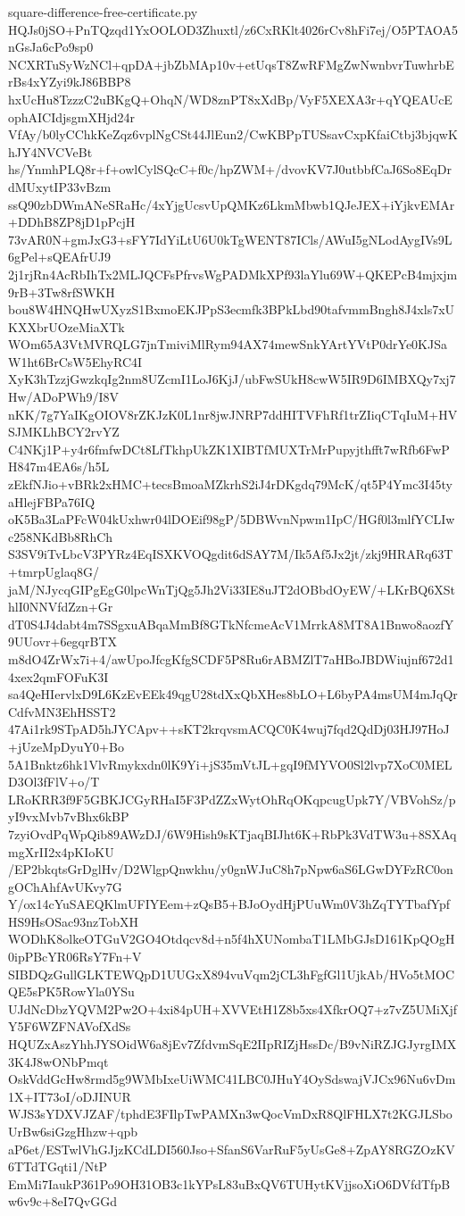 \documentclass[11pt]{article}
\theoremstyle{definition}
\theoremstyle{remark}
\begin{document}
\begin{filecontents*}[overwrite]{square-difference-free-certificate.py}
HQJs0jSO+PnTQzqd1YxOOLOD3Zhuxtl/z6CxRKlt4026rCv8hFi7ej/O5PTAOA5nGsJa6cPo9sp0
NCXRTuSyWzNCl+qpDA+jbZbMAp10v+etUqsT8ZwRFMgZwNwnbvrTuwhrbErBs4xYZyi9kJ86BBP8
hxUcHu8TzzzC2uBKgQ+OhqN/WD8znPT8xXdBp/VyF5XEXA3r+qYQEAUcEophAICIdjsgmXHjd24r
VfAy/b0lyCChkKeZqz6vplNgCSt44JlEun2/CwKBPpTUSsavCxpKfaiCtbj3bjqwKhJY4NVCVeBt
hs/YnmhPLQ8r+f+owlCylSQcC+f0c/hpZWM+/dvovKV7J0utbbfCaJ6So8EqDrdMUxytIP33vBzm
ssQ90zbDWmANeSRaHc/4xYjgUcsvUpQMKz6LkmMbwb1QJeJEX+iYjkvEMAr+DDhB8ZP8jD1pPcjH
73vAR0N+gmJxG3+sFY7IdYiLtU6U0kTgWENT87ICls/AWuI5gNLodAygIVs9L6gPel+sQEAfrUJ9
2j1rjRn4AcRbIhTx2MLJQCFsPfrvsWgPADMkXPf93laYlu69W+QKEPcB4mjxjm9rB+3Tw8rfSWKH
bou8W4HNQHwUXyzS1BxmoEKJPpS3ecmfk3BPkLbd90tafvmmBngh8J4xls7xUKXXbrUOzeMiaXTk
WOm65A3VtMVRQLG7jnTmiviMlRym94AX74mewSnkYArtYVtP0drYe0KJSaW1ht6BrCsW5EhyRC4I
XyK3hTzzjGwzkqIg2nm8UZcmI1LoJ6KjJ/ubFwSUkH8cwW5IR9D6IMBXQy7xj7Hw/ADoPWh9/I8V
nKK/7g7YaIKgOIOV8rZKJzK0L1nr8jwJNRP7ddHITVFhRf1trZIiqCTqIuM+HVSJMKLhBCY2rvYZ
C4NKj1P+y4r6fmfwDCt8LfTkhpUkZK1XIBTfMUXTrMrPupyjthfft7wRfb6FwPH847m4EA6s/h5L
zEkfNJio+vBRk2xHMC+tecsBmoaMZkrhS2iJ4rDKgdq79McK/qt5P4Ymc3I45tyaHlejFBPa76IQ
oK5Ba3LaPFcW04kUxhwr04lDOEif98gP/5DBWvnNpwm1IpC/HGf0l3mlfYCLIwc258NKdBb8RhCh
S3SV9iTvLbcV3PYRz4EqISXKVOQgdit6dSAY7M/Ik5Af5Jx2jt/zkj9HRARq63T+tmrpUglaq8G/
jaM/NJycqGIPgEgG0lpcWnTjQg5Jh2Vi33IE8uJT2dOBbdOyEW/+LKrBQ6XSthlI0NNVfdZzn+Gr
dT0S4J4dabt4m7SSgxuABqaMmBf8GTkNfcmeAcV1MrrkA8MT8A1Bnwo8aozfY9UUovr+6egqrBTX
m8dO4ZrWx7i+4/awUpoJfcgKfgSCDF5P8Ru6rABMZlT7aHBoJBDWiujnf672d14xex2qmFOFuK3I
sa4QeHIervlxD9L6KzEvEEk49qgU28tdXxQbXHes8bLO+L6byPA4msUM4mJqQrCdfvMN3EhHSST2
47Ai1rk9STpAD5hJYCApv++sKT2krqvsmACQC0K4wuj7fqd2QdDj03HJ97HoJ+jUzeMpDyuY0+Bo
5A1Bnktz6hk1VlvRmykxdn0lK9Yi+jS35mVtJL+gqI9fMYVO0Sl2lvp7XoC0MELD3Ol3fFlV+o/T
LRoKRR3f9F5GBKJCGyRHaI5F3PdZZxWytOhRqOKqpcugUpk7Y/VBVohSz/pyI9vxMvb7vBhx6kBP
7zyiOvdPqWpQib89AWzDJ/6W9Hish9sKTjaqBIJht6K+RbPk3VdTW3u+8SXAqmgXrII2x4pKIoKU
/EP2bkqtsGrDglHv/D2WlgpQnwkhu/y0gnWJuC8h7pNpw6aS6LGwDYFzRC0ongOChAhfAvUKvy7G
Y/ox14cYuSAEQKlmUFIYEem+zQsB5+BJoOydHjPUuWm0V3hZqTYTbafYpfHS9HsOSac93nzTobXH
WODhK8olkeOTGuV2GO4Otdqcv8d+n5f4hXUNombaT1LMbGJsD161KpQOgH0ipPBcYR06RsY7Fn+V
SIBDQzGullGLKTEWQpD1UUGxX894vuVqm2jCL3hFgfGl1UjkAb/HVo5tMOCQE5sPK5RowYla0YSu
UJdNcDbzYQVM2Pw2O+4xi84pUH+XVVEtH1Z8b5xs4XfkrOQ7+z7vZ5UMiXjfY5F6WZFNAVofXdSs
HQUZxAszYhhJYSOidW6a8jEv7ZfdvmSqE2IIpRIZjHssDc/B9vNiRZJGJyrgIMX3K4J8wONbPmqt
OskVddGcHw8rmd5g9WMbIxeUiWMC41LBC0JHuY4OySdswajVJCx96Nu6vDm1X+IT73oI/oDJINUR
WJS3sYDXVJZAF/tphdE3FIlpTwPAMXn3wQocVmDxR8QlFHLX7t2KGJLSboUrBw6siGzgHhzw+qpb
aP6et/ESTwlVhGJjzKCdLDI560Jso+SfanS6VarRuF5yUsGe8+ZpAY8RGZOzKV6TTdTGqti1/NtP
EmMi7IaukP361Po9OH31OB3c1kYPsL83uBxQV6TUHytKVjjsoXiO6DVfdTfpBw6v9c+8eI7QvGGd

\end{filecontents*}
\end{document}
